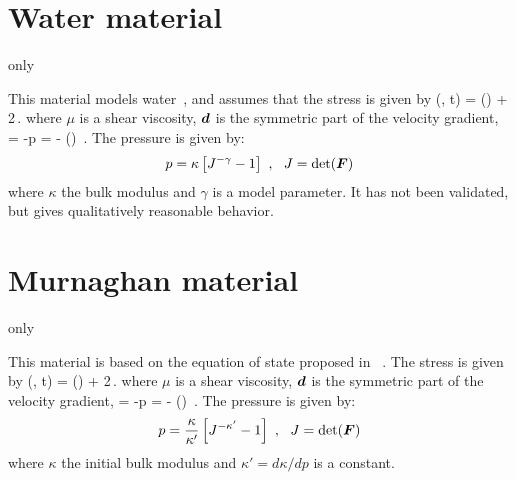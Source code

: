 \section{Water material}
  \MPM only

This material models water~\cite{water_model_ref}, and assumes that the stress is given by
\Beq
  \Bsig(\BF, t) = \pbar(\BF) \BI + 2\mu\,\Beta.
\Eeq
where $\mu$ is a shear viscosity, $\boldsymbol{d}$ is the symmetric part of the velocity gradient,
\Beq
  \pbar = -p \quad \Tand \quad \Beta = \BdT - \Third \Tr(\BdT) \BI \,.
\Eeq
The pressure is given by:
\begin{equation}
  p = \kappa\left[J^{-\gamma} - 1\right] ~,~~ J = \det(\boldsymbol{F})
\end{equation}
where $\kappa$ the bulk modulus and $\gamma$ is a model parameter.  
It has not been validated, but gives qualitatively reasonable behavior.

\section{Murnaghan material}
  \MPM only

This material is based on the equation of state proposed in ~\cite{Murnaghan1944}.
The stress is given by
\Beq
  \Bsig(\BF, t) = \pbar(\BF) \BI + 2\mu\,\Beta.
\Eeq
where $\mu$ is a shear viscosity, $\boldsymbol{d}$ is the symmetric part of the velocity gradient,
\Beq
  \pbar = -p \quad \Tand \quad \Beta = \BdT - \Third \Tr(\BdT) \BI \,.
\Eeq
The pressure is given by:
\begin{equation}
  p = \frac{\kappa}{\kappa'}\left[J^{-\kappa'} - 1\right] ~,~~ J = \det(\boldsymbol{F})
\end{equation}
where $\kappa$ the initial bulk modulus and $\kappa' = d\kappa/dp$ is a constant.
